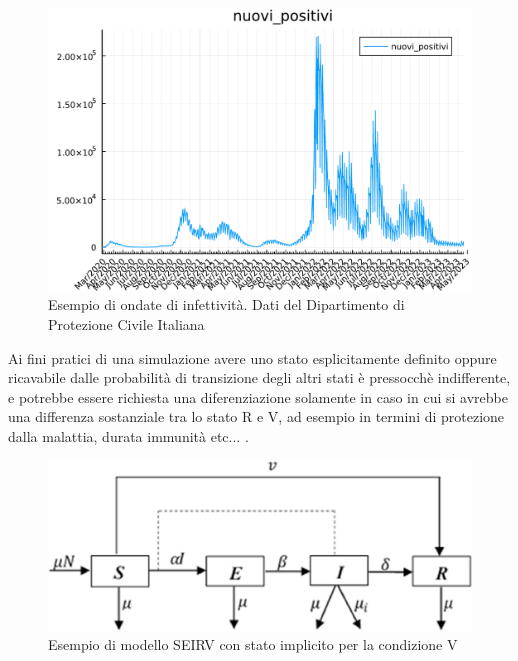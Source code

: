 \begin{figure}[h]
    \begin{center}
        \includegraphics[scale=0.6]{img/nuovi_positivi_2023-04-21.pdf}
        \caption{Esempio di ondate di infettività. Dati del Dipartimento di Protezione Civile Italiana}
        \label{fig:DPC_new_positive}
    \end{center}
\end{figure}

Ai fini pratici di una simulazione avere uno stato esplicitamente definito
oppure ricavabile dalle probabilità di transizione degli altri stati 
è pressocchè indifferente, e potrebbe essere richiesta una diferenziazione
solamente in caso in cui si avrebbe una differenza sostanziale tra lo stato
R e V, ad esempio in termini di protezione dalla malattia, durata immunità etc... .


\begin{figure}[h]
    \begin{center}
        \includegraphics[width=\linewidth]{img/seirv_implicit.jpg}
        \caption{Esempio di modello SEIRV con stato implicito per la condizione V}
        \label{fig:SEIRV_implicito}
    \end{center}
\end{figure}

